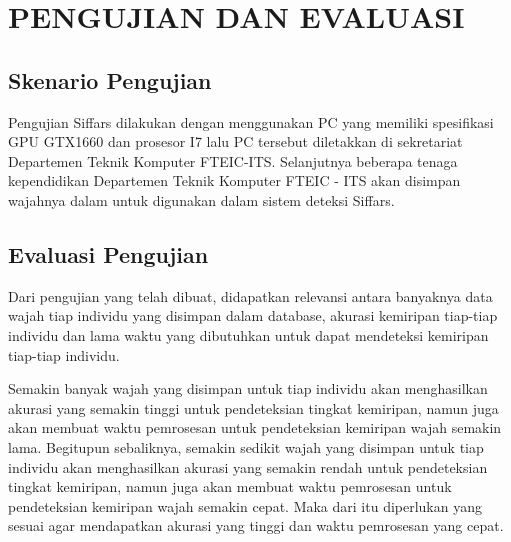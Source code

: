 \chapter{PENGUJIAN DAN EVALUASI}


\section{Skenario Pengujian}

Pengujian Siffars dilakukan dengan menggunakan PC yang memiliki spesifikasi GPU GTX1660 dan prosesor I7 lalu PC
tersebut diletakkan di sekretariat Departemen Teknik Komputer FTEIC-ITS. Selanjutnya beberapa tenaga kependidikan
Departemen Teknik Komputer FTEIC - ITS akan disimpan wajahnya dalam  untuk digunakan dalam sistem deteksi Siffars.

\section{Evaluasi Pengujian}

Dari pengujian yang telah dibuat, didapatkan relevansi antara banyaknya data wajah tiap individu yang disimpan dalam database,
akurasi kemiripan tiap-tiap individu dan lama waktu yang dibutuhkan untuk dapat mendeteksi kemiripan tiap-tiap individu.

Semakin banyak wajah yang disimpan untuk tiap individu akan menghasilkan akurasi yang semakin tinggi untuk pendeteksian tingkat kemiripan,
namun juga akan membuat waktu pemrosesan untuk pendeteksian kemiripan wajah semakin lama. Begitupun sebaliknya,
semakin sedikit wajah yang disimpan untuk tiap individu akan menghasilkan akurasi yang semakin rendah untuk pendeteksian tingkat kemiripan,
namun juga akan membuat waktu pemrosesan untuk pendeteksian kemiripan wajah semakin cepat. Maka dari itu diperlukan
 yang sesuai agar mendapatkan akurasi yang tinggi dan waktu pemrosesan yang cepat.

